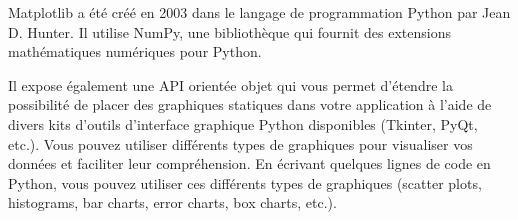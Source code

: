 \begin{enumerate}
        Matplotlib a été créé en 2003 dans le langage de programmation Python par Jean D. Hunter. Il utilise NumPy, une bibliothèque qui fournit des extensions mathématiques numériques pour Python. 
        
        Il expose également une API orientée objet qui vous permet d'étendre la possibilité de placer des graphiques statiques dans votre application à l'aide de divers kits d'outils d'interface graphique Python disponibles (Tkinter, PyQt, etc.). 
        Vous pouvez utiliser différents types de graphiques pour visualiser vos données et faciliter leur compréhension. En écrivant quelques lignes de code en Python, vous pouvez utiliser ces différents types de graphiques (scatter plots, histograms, bar charts, error charts, box charts, etc.).

        \bfseries
    \end{enumerate}
